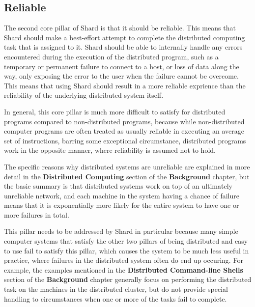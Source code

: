 \documentclass[twoside]{report}
\begin{document}
\subsection{Reliable}

The second core pillar of Shard is that it should be reliable.
This means that Shard should make a best-effort attempt to complete the distributed computing task that is assigned to it.
Shard should be able to internally handle any errors encountered during the execution of the distributed program, such as a temporary or permanent failure to connect to a host, or loss of data along the way, only exposing the error to the user when the failure cannot be overcome.
This means that using Shard should result in a more reliable exprience than the reliability of the underlying distributed system itself.

In general, this core pillar is much more difficult to satisfy for distributed programs compared to non-distributed programs, because while non-distributed computer programs are often treated as usually reliable in executing an average set of instructions, barring some exceptional circumstance, distributed programs work in the opposite manner, where reliability is assumed not to hold.

The specific reasons why distributed systems are unreliable are explained in more detail in the \textbf{Distributed Computing} section of the \textbf{Background} chapter, but the basic summary is that distributed systems work on top of an ultimately unreliable network, and each machine in the system having a chance of failure means that it is exponentially more likely for the entire system to have one or more failures in total.

This pillar needs to be addressed by Shard in particular because many simple computer systems that satisfy the other two pillars of being distributed and easy to use fail to satisfy this pillar, which causes the system to be much less useful in practice, where failures in the distributed system often do end up occuring.
For example, the examples mentioned in the \textbf{Distributed Command-line Shells} section of the \textbf{Background} chapter generally focus on performing the distributed task on the machines in the distributed cluster, but do not provide special handling to circumstances when one or more of the tasks fail to complete.
\end{document}
